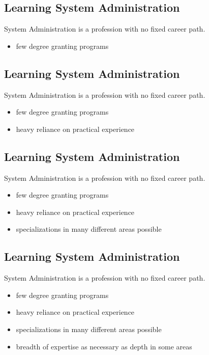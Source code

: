\documentclass[xga]{xdvislides}
\begin{document}
\subsection{Learning System Administration}
System Administration is a profession with no fixed career path.

\begin{itemize}
	\item few degree granting programs
\end{itemize}

\subsection{Learning System Administration}
System Administration is a profession with no fixed career path.

\begin{itemize}
	\item few degree granting programs
	\item heavy reliance on practical experience
\end{itemize}

\subsection{Learning System Administration}
System Administration is a profession with no fixed career path.

\begin{itemize}
	\item few degree granting programs
	\item heavy reliance on practical experience
	\item specializations in many different areas possible
\end{itemize}

\subsection{Learning System Administration}
System Administration is a profession with no fixed career path.

\begin{itemize}
	\item few degree granting programs
	\item heavy reliance on practical experience
	\item specializations in many different areas possible
	\item breadth of expertise as necessary as depth in some areas
\end{itemize}
\end{document}
